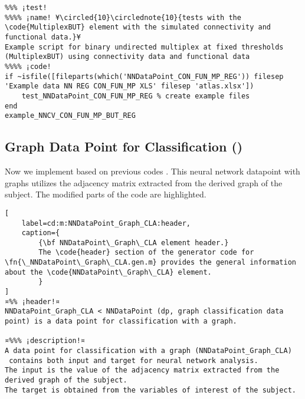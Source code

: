 \documentclass{tufte-handout}
\begin{document}
\begin{lstlisting}
%%% ¡test!
%%%% ¡name! ¥\circled{10}\circlednote{10}{tests with the \code{MultiplexBUT} element with the simulated connectivity and functional data.}¥
Example script for binary undirected multiplex at fixed thresholds (MultiplexBUT) using connectivity data and functional data
%%%% ¡code!
if ~isfile([fileparts(which('NNDataPoint_CON_FUN_MP_REG')) filesep 'Example data NN REG CON_FUN_MP XLS' filesep 'atlas.xlsx'])
    test_NNDataPoint_CON_FUN_MP_REG % create example files
end
example_NNCV_CON_FUN_MP_BUT_REG

\end{lstlisting}

\clearpage
\subsection{Graph Data Point for Classification ()}

Now we implement  based on previous codes .
This neural network datapoint with graphs utilizes the adjacency matrix extracted from the derived graph of the subject. 
The modified parts of the code are highlighted.

\begin{lstlisting}[
	label=cd:m:NNDataPoint_Graph_CLA:header,
	caption={
		{\bf NNDataPoint\_Graph\_CLA element header.}
		The \code{header} section of the generator code for \fn{\_NNDataPoint\_Graph\_CLA.gen.m} provides the general information about the \code{NNDataPoint\_Graph\_CLA} element.
		}
]
¤%% ¡header!¤
NNDataPoint_Graph_CLA < NNDataPoint (dp, graph classification data point) is a data point for classification with a graph.

¤%%% ¡description!¤
A data point for classification with a graph (NNDataPoint_Graph_CLA) 
 contains both input and target for neural network analysis.
The input is the value of the adjacency matrix extracted from the derived graph of the subject.
The target is obtained from the variables of interest of the subject.
\end{lstlisting}
\end{document}
